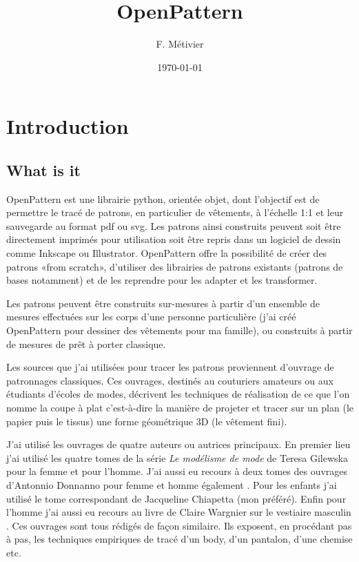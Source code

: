 \documentclass[11pt,a4paper]{report}
\begin{document}
\title{OpenPattern}
\author{F. Métivier}
\date{\today}
\maketitle

\tableofcontents


\chapter{Introduction}

\section{What is it}
OpenPattern  est une librairie python, orientée objet,  dont l'objectif est de permettre le tracé de patrons, en particulier de vêtements, à l'échelle 1:1 et leur sauvegarde au format pdf ou svg. Les patrons ainsi construits peuvent soit être directement imprimés pour utilisation soit être repris dans un logiciel de dessin comme Inkscape ou Illustrator.
OpenPattern offre la possibilité de créer des patrons «from scratch», d'utiliser des librairies de patrons existants (patrons de bases notamment) et de les reprendre pour les adapter et les transformer.

Les patrons peuvent être construits sur-mesures à partir d'un ensemble de mesures effectuées sur les corps d'une personne particulière (j'ai créé OpenPattern pour dessiner des vêtements pour ma famille), ou construits à partir de mesures de prêt à porter classique.

Les sources que j'ai utilisées pour tracer les patrons proviennent d'ouvrage de patronnages classiques. Ces ouvrages, destinés au couturiers amateurs ou aux étudiants d'écoles de modes, décrivent les techniques de réalisation de ce que l'on nomme la coupe à plat c'est-à-dire  la manière de projeter et tracer sur un plan (le papier puis le tissus) une forme géométrique 3D (le vêtement fini).

J'ai utilisé les ouvrages de quatre auteurs ou autrices principaux.
En premier lieu j'ai utilisé les quatre tomes de la série \textit{Le modélisme de mode} de Teresa Gilewska pour la femme et pour l'homme\cite{Gilewska1,Gilewska2,Gilewska4,Gilewska5}. J'ai aussi eu recours à deux tomes des ouvrages d'Antonnio Donnanno pour femme et homme également \cite{Donnanno2005,Donnanno2016}. Pour les enfants j'ai utilisé le tome correspondant de Jacqueline Chiapetta  \cite{Chiappetta1999} (mon préféré). Enfin pour l'homme j'ai aussi eu recours au livre de  Claire Wargnier sur le vestiaire masculin \cite{wargnier2012}. Ces ouvrages sont tous rédigés de façon similaire. Ils exposent, en procédant pas à pas, les techniques empiriques de tracé d'un body, d'un pantalon, d'une chemise etc.
\end{document}
